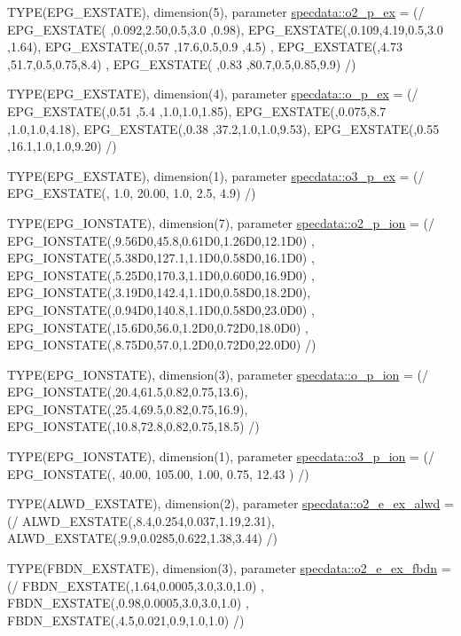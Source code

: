 \begin{DoxyCompactItemize}
\item 
TYPE(EPG\_\-EXSTATE), dimension(5), parameter \hyperlink{namespacespecdata_ae681c0bc4ab2fa5470a5956b4bec78d0}{specdata::o2\_\-p\_\-ex} = (/ EPG\_\-EXSTATE( ,0.092,2.50,0.5,3.0 ,0.98), EPG\_\-EXSTATE(,0.109,4.19,0.5,3.0 ,1.64), EPG\_\-EXSTATE(,0.57 ,17.6,0.5,0.9 ,4.5) , EPG\_\-EXSTATE(,4.73 ,51.7,0.5,0.75,8.4) , EPG\_\-EXSTATE( ,0.83 ,80.7,0.5,0.85,9.9) /)
\item 
TYPE(EPG\_\-EXSTATE), dimension(4), parameter \hyperlink{namespacespecdata_ae83fc5fae3d6873e5453849a6289952f}{specdata::o\_\-p\_\-ex} = (/ EPG\_\-EXSTATE(,0.51 ,5.4 ,1.0,1.0,1.85), EPG\_\-EXSTATE(,0.075,8.7 ,1.0,1.0,4.18), EPG\_\-EXSTATE(,0.38 ,37.2,1.0,1.0,9.53), EPG\_\-EXSTATE(,0.55 ,16.1,1.0,1.0,9.20) /)
\item 
TYPE(EPG\_\-EXSTATE), dimension(1), parameter \hyperlink{namespacespecdata_a5715afaf9a7cd31ff6c899aec265dc7e}{specdata::o3\_\-p\_\-ex} = (/ EPG\_\-EXSTATE(, 1.0, 20.00, 1.0, 2.5, 4.9) /)
\item 
TYPE(EPG\_\-IONSTATE), dimension(7), parameter \hyperlink{namespacespecdata_a1de88d1ad1d0aa421deaf2c5ac887ed8}{specdata::o2\_\-p\_\-ion} = (/ EPG\_\-IONSTATE(,9.56D0,45.8,0.61D0,1.26D0,12.1D0) , EPG\_\-IONSTATE(,5.38D0,127.1,1.1D0,0.58D0,16.1D0) , EPG\_\-IONSTATE(,5.25D0,170.3,1.1D0,0.60D0,16.9D0) , EPG\_\-IONSTATE(,3.19D0,142.4,1.1D0,0.58D0,18.2D0), EPG\_\-IONSTATE(,0.94D0,140.8,1.1D0,0.58D0,23.0D0) , EPG\_\-IONSTATE(,15.6D0,56.0,1.2D0,0.72D0,18.0D0) , EPG\_\-IONSTATE(,8.75D0,57.0,1.2D0,0.72D0,22.0D0) /)
\item 
TYPE(EPG\_\-IONSTATE), dimension(3), parameter \hyperlink{namespacespecdata_a67659f2839588aff464762d181bccdd7}{specdata::o\_\-p\_\-ion} = (/ EPG\_\-IONSTATE(,20.4,61.5,0.82,0.75,13.6), EPG\_\-IONSTATE(,25.4,69.5,0.82,0.75,16.9), EPG\_\-IONSTATE(,10.8,72.8,0.82,0.75,18.5) /)
\item 
TYPE(EPG\_\-IONSTATE), dimension(1), parameter \hyperlink{namespacespecdata_a42d18c80256a5ca2ccebe8a3f4d451a0}{specdata::o3\_\-p\_\-ion} = (/ EPG\_\-IONSTATE(, 40.00, 105.00, 1.00, 0.75, 12.43 ) /)
\item 
TYPE(ALWD\_\-EXSTATE), dimension(2), parameter \hyperlink{namespacespecdata_accca75874b57e169b91c0b680bffd51f}{specdata::o2\_\-e\_\-ex\_\-alwd} = (/ ALWD\_\-EXSTATE(,8.4,0.254,0.037,1.19,2.31), ALWD\_\-EXSTATE(,9.9,0.0285,0.622,1.38,3.44) /)
\item 
TYPE(FBDN\_\-EXSTATE), dimension(3), parameter \hyperlink{namespacespecdata_af2d6b8fc566715d79d76b79cc900229e}{specdata::o2\_\-e\_\-ex\_\-fbdn} = (/ FBDN\_\-EXSTATE(,1.64,0.0005,3.0,3.0,1.0) , FBDN\_\-EXSTATE(,0.98,0.0005,3.0,3.0,1.0) , FBDN\_\-EXSTATE(,4.5,0.021,0.9,1.0,1.0) /)

\end{DoxyCompactItemize}
